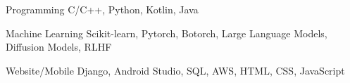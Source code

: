 

\begin{cvskills}

  \cvskill
    {Programming} %
    {C/C++, Python, Kotlin, Java} %

  \cvskill
    {Machine Learning} %
    {Scikit-learn, Pytorch, Botorch, Large Language Models, Diffusion Models, RLHF} %

  \cvskill
    {Website/Mobile} %
    {Django, Android Studio, SQL, AWS, HTML, CSS, JavaScript} %




\end{cvskills}
